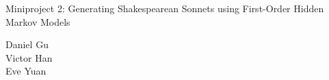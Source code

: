 



\pagestyle{fancy}

\LARGE
\begin{center}
Miniproject 2: Generating Shakespearean Sonnets using First-Order Hidden Markov Models

\large
Daniel Gu \\
Victor Han \\
Eve Yuan
\end{center}

\normalsize
\medskip

